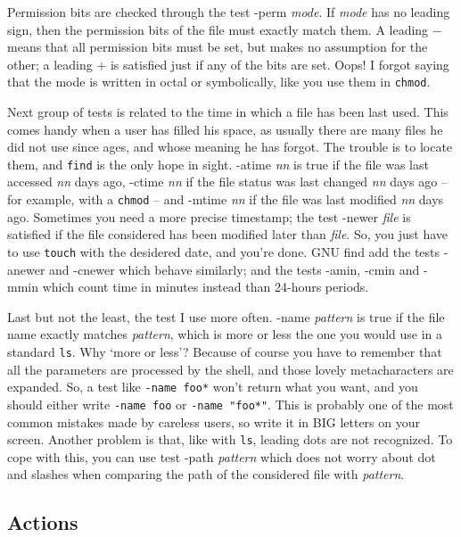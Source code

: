 Permission bits are checked through the test {\sf -perm {\em mode\/}}. If
{\em mode\/} has no leading sign, then the permission bits of the file must 
exactly match them. A leading $-$ means that all permission bits must be
set, but makes no assumption for the other; a leading $+$ is satisfied
just if any of the bits are set. Oops! I forgot saying that the mode is
written in octal or symbolically, like you use them in {\tt chmod}.

Next group of tests is related to the time in which a file has been last
used. This comes handy when a user has filled his space, as usually there
are many files he did not use since ages, and whose meaning he has forgot.
The trouble is to locate them, and {\tt find} is the only hope in sight.
{\sf -atime {\em nn\/}} is true if the file was last accessed {\em nn}
days ago, {\sf -ctime {\em nn\/}} if the file status was last changed {\em
nn\/} days ago -- for example, with a {\tt chmod} -- and {\sf -mtime {\em
nn\/}} if the file was last modified {\em nn\/} days ago. Sometimes you
need a more precise timestamp; the test {\sf -newer {\em file\/}} is
satisfied if the file considered has been modified later than {\em
file\/}. So, you just have to use {\tt touch} with the desidered date, and
you're done. GNU find add the tests {\sf -anewer} and {\sf -cnewer} which
behave similarly; and the tests {\sf -amin}, {\sf -cmin} and {\sf -mmin}
which count time in minutes instead than 24-hours periods.

Last but not the least, the test I use more often. {\sf -name {\em
pattern\/}} is true if the file name exactly matches {\em pattern\/},
which is more or less the one you would use in a standard {\tt ls}. Why
`more or less'? Because of course you have to remember that all the 
parameters are processed by the shell, and those lovely metacharacters
are expanded. So, a test like {\tt -name foo*} won't return what you want,
and you should either write {\tt -name foo\*} or {\tt -name "foo*"}. This
is probably one of the most common mistakes made by careless users, so
write it in BIG letters on your screen. Another problem is that, like with
{\tt ls}, leading dots are not recognized. To cope with this, you can use
test {\sf -path {\em pattern\/}} which does not worry about dot and
slashes when comparing the path of the considered file with {\em
pattern\/}.

\subsection{Actions}

